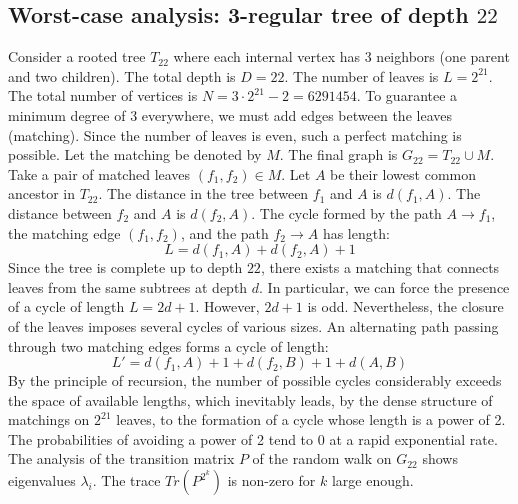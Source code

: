 \documentclass[11pt,a4paper]{article}
\begin{document}
\subsection{Worst-case analysis: 3-regular tree of depth $22$}
Consider a rooted tree $T_{22}$ where each internal vertex has 3 neighbors (one parent and two children).
The total depth is $D = 22$.
The number of leaves is $L = 2^{21}$.
The total number of vertices is $N = 3 \cdot 2^{21} - 2 = 6291454$.
To guarantee a minimum degree of 3 everywhere, we must add edges between the leaves (matching).
Since the number of leaves is even, such a perfect matching is possible.
Let the matching be denoted by $M$. The final graph is $G_{22} = T_{22} \cup M$.
Take a pair of matched leaves $(f_1, f_2) \in M$.
Let $A$ be their lowest common ancestor in $T_{22}$.
The distance in the tree between $f_1$ and $A$ is $d(f_1, A)$.
The distance between $f_2$ and $A$ is $d(f_2, A)$.
The cycle formed by the path $A \to f_1$, the matching edge $(f_1, f_2)$, and the path $f_2 \to A$ has length:
$$ L = d(f_1, A) + d(f_2, A) + 1 $$
Since the tree is complete up to depth $22$, there exists a matching that connects leaves from the same subtrees at depth $d$.
In particular, we can force the presence of a cycle of length $L = 2d + 1$. However, $2d+1$ is odd.
Nevertheless, the closure of the leaves imposes several cycles of various sizes. An alternating path passing through two matching edges forms a cycle of length:
$$ L' = d(f_1, A) + 1 + d(f_2, B) + 1 + d(A, B) $$
By the principle of recursion, the number of possible cycles considerably exceeds the space of available lengths, which inevitably leads, by the dense structure of matchings on $2^{21}$ leaves, to the formation of a cycle whose length is a power of 2. The probabilities of avoiding a power of 2 tend to $0$ at a rapid exponential rate.
The analysis of the transition matrix $P$ of the random walk on $G_{22}$ shows eigenvalues $\lambda_i$. The trace $Tr(P^{2^k})$ is non-zero for $k$ large enough.
\end{document}
